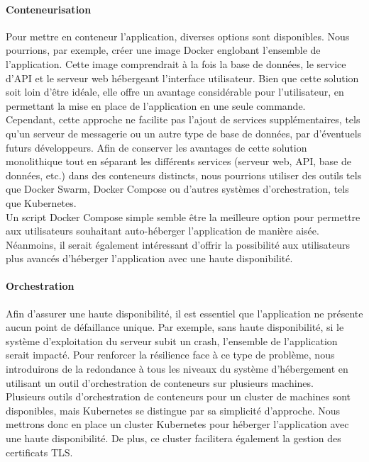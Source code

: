 \paragraph{Conteneurisation}
Pour mettre en conteneur l'application, diverses options sont disponibles.
Nous pourrions, par exemple, créer une image Docker englobant l'ensemble de l'application.
Cette image comprendrait à la fois la base de données, le service d'API et le serveur web hébergeant l'interface utilisateur.
Bien que cette solution soit loin d'être idéale, elle offre un avantage considérable pour l'utilisateur, en permettant la mise en place de l'application en une seule commande.\\

Cependant, cette approche ne facilite pas l'ajout de services supplémentaires, tels qu'un serveur de messagerie ou un autre type de base de données, par d'éventuels futurs développeurs.
Afin de conserver les avantages de cette solution monolithique tout en séparant les différents services (serveur web, API, base de données, etc.) dans des conteneurs distincts,
nous pourrions utiliser des outils tels que Docker Swarm, Docker Compose ou d'autres systèmes d'orchestration, tels que Kubernetes. \\

Un script Docker Compose simple semble être la meilleure option pour permettre aux utilisateurs souhaitant auto-héberger l'application de manière aisée.
Néanmoins, il serait également intéressant d'offrir la possibilité aux utilisateurs plus avancés d'héberger l'application avec une haute disponibilité.

\paragraph{Orchestration}
Afin d'assurer une haute disponibilité, il est essentiel que l'application ne présente aucun point de défaillance unique.
Par exemple, sans haute disponibilité, si le système d'exploitation du serveur subit un crash, l'ensemble de l'application serait impacté.
Pour renforcer la résilience face à ce type de problème,
nous introduirons de la redondance à tous les niveaux du système d'hébergement en utilisant un outil d'orchestration de conteneurs sur plusieurs machines.\\

Plusieurs outils d'orchestration de conteneurs pour un cluster de machines sont disponibles, mais Kubernetes se distingue par sa simplicité d'approche.
Nous mettrons donc en place un cluster Kubernetes pour héberger l'application avec une haute disponibilité.
De plus, ce cluster facilitera également la gestion des certificats TLS\@.\\

